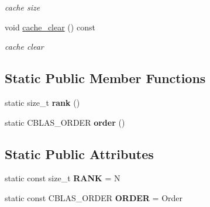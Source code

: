\begin{DoxyCompactItemize}
\begin{DoxyCompactList}\small\item\em cache size \item\end{DoxyCompactList}\item 
\hypertarget{classbtas_1_1_sp_tensor_af3d1ee1d9edd4315b6e4c8810029eeb8}{
void \hyperlink{classbtas_1_1_sp_tensor_af3d1ee1d9edd4315b6e4c8810029eeb8}{cache\_\-clear} () const }
\label{classbtas_1_1_sp_tensor_af3d1ee1d9edd4315b6e4c8810029eeb8}

\begin{DoxyCompactList}\small\item\em cache clear \item\end{DoxyCompactList}\end{DoxyCompactItemize}
\subsection*{Static Public Member Functions}
\begin{DoxyCompactItemize}
\item 
\hypertarget{classbtas_1_1_sp_tensor_a491d9d0f0c305a120e800a463f10dca9}{
static size\_\-t {\bfseries rank} ()}
\label{classbtas_1_1_sp_tensor_a491d9d0f0c305a120e800a463f10dca9}

\item 
\hypertarget{classbtas_1_1_sp_tensor_a5e8f35ce7ae277ccd5073fed6665be6e}{
static CBLAS\_\-ORDER {\bfseries order} ()}
\label{classbtas_1_1_sp_tensor_a5e8f35ce7ae277ccd5073fed6665be6e}

\end{DoxyCompactItemize}
\subsection*{Static Public Attributes}
\begin{DoxyCompactItemize}
\item 
\hypertarget{classbtas_1_1_sp_tensor_aeebc5cf5e3b3594243135adc95ced0b7}{
static const size\_\-t {\bfseries RANK} = N}
\label{classbtas_1_1_sp_tensor_aeebc5cf5e3b3594243135adc95ced0b7}

\item 
\hypertarget{classbtas_1_1_sp_tensor_a5a4eea281413f74cc23335c7d3cc2b23}{
static const CBLAS\_\-ORDER {\bfseries ORDER} = Order}
\label{classbtas_1_1_sp_tensor_a5a4eea281413f74cc23335c7d3cc2b23}

\end{DoxyCompactItemize}
